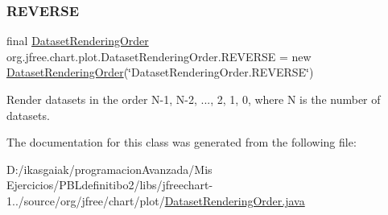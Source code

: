 \subsubsection{\texorpdfstring{R\+E\+V\+E\+R\+SE}{REVERSE}}
{\footnotesize\ttfamily final \mbox{\hyperlink{classorg_1_1jfree_1_1chart_1_1plot_1_1_dataset_rendering_order}{Dataset\+Rendering\+Order}} org.\+jfree.\+chart.\+plot.\+Dataset\+Rendering\+Order.\+R\+E\+V\+E\+R\+SE = new \mbox{\hyperlink{classorg_1_1jfree_1_1chart_1_1plot_1_1_dataset_rendering_order}{Dataset\+Rendering\+Order}}(\char`\"{}Dataset\+Rendering\+Order.\+R\+E\+V\+E\+R\+SE\char`\"{})\hspace{0.3cm}{\ttfamily [static]}}

Render datasets in the order N-\/1, N-\/2, ..., 2, 1, 0, where N is the number of datasets. 

The documentation for this class was generated from the following file\+:\begin{DoxyCompactItemize}
\item 
D\+:/ikasgaiak/programacion\+Avanzada/\+Mis Ejercicios/\+P\+B\+Ldefinitibo2/libs/jfreechart-\/1../source/org/jfree/chart/plot/\mbox{\hyperlink{_dataset_rendering_order_8java}{Dataset\+Rendering\+Order.\+java}}\end{DoxyCompactItemize}
